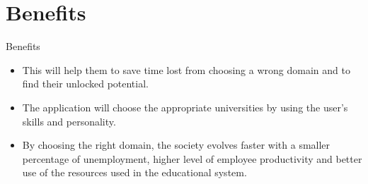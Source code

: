 \documentclass{beamer}
\begin{document}
\section{Benefits}

\begin{frame}{Benefits}
	
	\begin{itemize}
		\item This will help them to save time lost from choosing a wrong domain and to find their unlocked potential.
	\end{itemize}

	\begin{itemize}
		\item The application will choose the appropriate universities by using the user's skills and personality.
	\end{itemize}

	\begin{itemize}
		\item By choosing the right domain, the society evolves faster with a smaller percentage of unemployment, higher level of employee productivity and better use of the resources used in the educational system.
	\end{itemize}

\end{frame}


\end{document}
